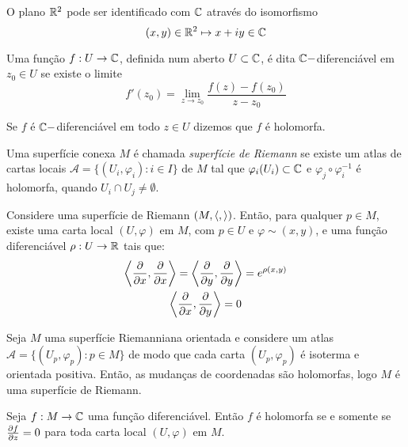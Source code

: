 \begin{obse}
	O plano $\mathbb{R}^2$ pode ser identificado com $\mathbb{C}$ através do isomorfismo
	\begin{equation*}
		(x,y) \in \mathbb{R}^2 \mapsto x + iy \in \mathbb{C}
	\end{equation*}
	
	Uma função $f: U \rightarrow \mathbb{C}$, definida num aberto $U \subset \mathbb{C}$, é dita $\mathbb{C}-$diferenciável em $z_0 \in U$ se existe o limite
	\begin{equation*}
		f'(z_0) = \lim_{z \rightarrow z_0} \frac{f(z) - f(z_0)}{z - z_0}
	\end{equation*}
	
	Se $f$ é $\mathbb{C}-$diferenciável em todo $z \in U$ dizemos que $f$ é holomorfa.
\end{obse}

\begin{defi}
	Uma superfície conexa $M$ é chamada \emph{superfície de Riemann} se existe um atlas de cartas locais $\mathcal{A} = \{ (U_i,\varphi_i): i \in I \}$ de $M$ tal que $\varphi_i(U_i) \subset \mathbb{C}$ e $\varphi_j \circ \varphi_i^{-1}$ é holomorfa, quando $U_i \cap U_j \neq \emptyset$.
\end{defi}

\begin{teo}
	Considere uma superfície de Riemann $(M, \left\langle , \right\rangle)$. Então, para qualquer $p \in M$, existe uma carta local $(U,\varphi)$ em $M$, com $p \in U$ e $\varphi \sim (x,y)$, e uma função diferenciável $\rho: U \rightarrow \mathbb{R}$ tais que:
	\begin{gather*}
		\left\langle \frac{\partial}{\partial x},\frac{\partial}{\partial x} \right\rangle = \left\langle \frac{\partial}{\partial y},\frac{\partial}{\partial y} \right\rangle = e^{\rho(x,y)}\\
		\left\langle \frac{\partial}{\partial x},\frac{\partial}{\partial y} \right\rangle = 0
	\end{gather*}
\end{teo}

\begin{teo}
	Seja $M$ uma superfície Riemanniana orientada e considere um atlas $\mathcal{A} = \{ (U_p,\varphi_p): p \in M \}$ de modo que cada carta $(U_p,\varphi_p)$ é isoterma e orientada positiva. Então, as mudanças de coordenadas são holomorfas, logo $M$ é uma superfície de Riemann.
\end{teo}

\begin{prop}
	Seja $f: M \rightarrow \mathbb{C}$ uma função diferenciável. Então $f$ é holomorfa se e somente se $\frac{\partial f}{\partial z} = 0$ para toda carta local $(U,\varphi)$ em $M$.
\end{prop}

